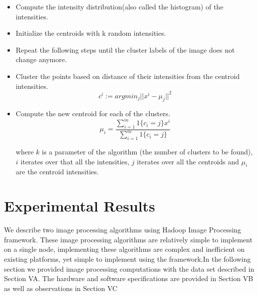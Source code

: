 \documentclass[conference]{IEEEtran}
\begin{document}
\begin{itemize}
	\item Compute the intensity distribution(also called the histogram) of the intensities.
	\item Initialize the centroids with k random intensities.
	\item Repeat the following steps until the cluster labels of the image does not change anymore.
	\item Cluster the points based on distance of their intensities from the centroid intensities.
	\begin{equation}
		c^{i} := arg min_{j}||x^{i} - \mu_{j}||^2
	\end{equation}
	\item Compute the new centroid for each of the clusters.
	\begin{equation}
		\mu_{i} = \frac{\sum\limits_{i=1}^{m} 1\{c_{i} = j\}x^i}{\sum\limits_{i=1}^{m} 1\{c_{i} = j\}}
	\end{equation}
	
	where \begin{math}k\end{math} is a parameter of the algorithm (the number of clusters to be found), \begin{math}i\end{math} iterates over that all the intensities, \begin{math}j\end{math} iterates over all the centroids and \begin{math}\mu_{i}\end{math} are the centroid intensities.
\end{itemize}
	

\section{Experimental Results}


We describe two image processing algorithms using Hadoop Image Processing framework. These image processing algorithms are relatively simple to implement on a single node, implementing these algorithms are complex and inefficient on existing platforms, yet simple to implement using the framework.In the following section we provided image processing computations with the data set described in Section VA. The hardware and software specifications are provided in Section VB as well as observations in Section VC 


\end{document}

